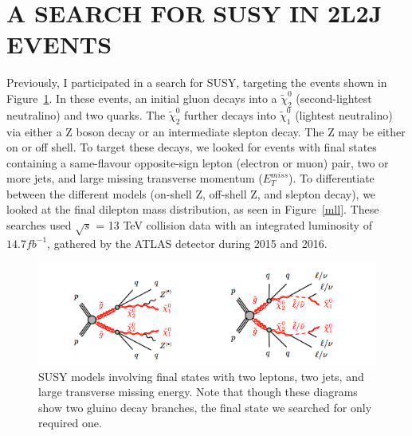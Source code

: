 \documentclass{article}
\begin{document}
\section*{A SEARCH FOR SUSY IN 2L2J EVENTS}

Previously, I participated in a search for SUSY, targeting the events shown in Figure~\ref{SUSY_2l2j}. In these events, an initial gluon decays into a $\tilde{\chi}^0_2$ (second-lightest neutralino) and two quarks. The $\tilde{\chi}^0_2$ further decays into $\tilde{\chi}^0_1$ (lightest neutralino) via either a Z boson decay or an intermediate slepton decay. The Z may be either on or off shell. To target these decays, we looked for events with final states containing a same-flavour opposite-sign lepton (electron or muon) pair, two or more jets, and large missing transverse momentum ($E_T^{miss}$). To differentiate between the different models (on-shell Z, off-shell Z, and slepton decay), we looked at the final dilepton mass distribution, as seen in Figure~\ref{mll}. These searches used $\sqrt{s}$ = 13 TeV collision data with an integrated luminosity of $14.7 fb^{-1}$, gathered by the ATLAS detector during 2015 and 2016.

\begin{figure}[t]
    \centering
    \includegraphics[width=0.7\linewidth]{images/SUSY_2l2j.png}
    \caption{SUSY models involving final states with two leptons, two jets, and large transverse missing energy. Note that though these diagrams show two gluino decay branches, the final state we searched for only required one.}
    \label{SUSY_2l2j}
\end{figure}
\end{document}
